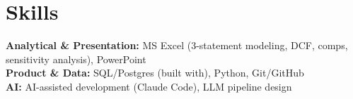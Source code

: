 \documentclass[10pt,letterpaper]{article}
\begin{document}
\section*{Skills}
\textbf{Analytical \& Presentation:} MS Excel (3-statement modeling, DCF, comps, sensitivity analysis), PowerPoint\\[2pt]
\textbf{Product \& Data:} SQL/Postgres (built with), Python, Git/GitHub\\[2pt]
\textbf{AI:} AI-assisted development (Claude Code), LLM pipeline design
\end{document}
